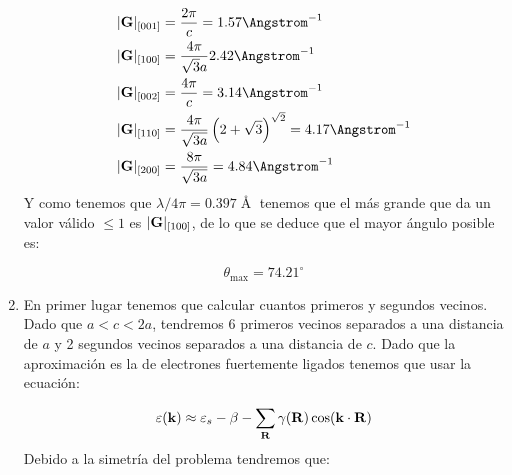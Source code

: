 \begin{solucion}
\begin{enumerate}[label=\alph*)]
		\begin{align*}
			|\Gn|_{[001]} & = \frac{2\pi}{c} = 1.57 \unit{\Angstrom^{-1}} \\ 
			|\Gn|_{[100]} & = \frac{4\pi}{\sqrt{3}a} 2.42\unit{\Angstrom^{-1}}   \\ 
			|\Gn|_{[002]} & = \frac{4\pi}{c} = 3.14 \unit{\Angstrom^{-1}}  \\  
			|\Gn|_{[110]} & = \frac{4 \pi }{\sqrt{3a}} \parentesis{2+\sqrt{3}}^{\sqrt{2}} = 4.17 \unit{\Angstrom^{-1}} \\  
			|\Gn|_{[200]} & = \frac{8 \pi }{\sqrt{3a}} = 4.84 \unit{\Angstrom^{-1}} \\  
		\end{align*} 
		Y como tenemos que $\lambda/4\pi= 0.397 \unit{\Angstrom}$ tenemos que el más grande que da un valor válido $\leq 1$ es $|\mathbf{G}|_{[100]}$, de lo que se deduce que el mayor ángulo posible es:
		
		\begin{equation}
			\theta_{\max} = 74.21 ^\circ
		\end{equation}
		
		 \item En primer lugar tenemos que calcular cuantos primeros y segundos vecinos. Dado que $a<c<2a$, tendremos 6 primeros vecinos separados a una distancia de $a$ y 2 segundos vecinos separados a una distancia de $c$. Dado que la aproximación es la de electrones fuertemente ligados tenemos que usar la ecuación:
		 
		 \begin{equation}
		 	\varepsilon(\mathbf{k}) \approx \varepsilon_s - \beta - \sum_{\mathbf{R}} \gamma (\mathbf{R}) \cos (\mathbf{k} \cdot \mathbf{R})
		 \end{equation}
		 Debido a la simetría del problema tendremos que: 
		 

\end{enumerate}
\end{solucion}

